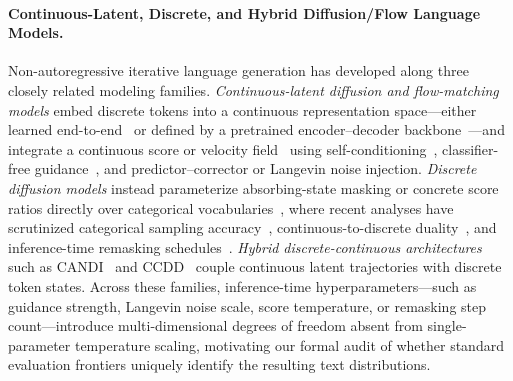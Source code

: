 \documentclass[11pt,a4paper]{article}
\begin{document}
\paragraph{Continuous-Latent, Discrete, and Hybrid Diffusion/Flow Language Models.}
Non-autoregressive iterative language generation has developed along three closely related modeling families. \emph{Continuous-latent diffusion and flow-matching models} embed discrete tokens into a continuous representation space---either learned end-to-end~\citep{li2022diffusionlm,dieleman2022cdcd,gulrajani2023plaid} or defined by a pretrained encoder--decoder backbone~\citep{raffel2020exploring,lovelace2023ld4lg,hu2026elf,jiang2026textldm,guo2026coladlm}---and integrate a continuous score or velocity field~\citep{lipman2023flow} using self-conditioning~\citep{chen2023analog}, classifier-free guidance~\citep{ho2022classifier}, and predictor--corrector or Langevin noise injection. \emph{Discrete diffusion models} instead parameterize absorbing-state masking or concrete score ratios directly over categorical vocabularies~\citep{lou2024sedd,sahoo2024mdlm}, where recent analyses have scrutinized categorical sampling accuracy~\citep{zheng2025masked}, continuous-to-discrete duality~\citep{sahoo2025duo}, and inference-time remasking schedules~\citep{wang2025remdm}. \emph{Hybrid discrete-continuous architectures} such as CANDI~\citep{pynadath2025candi} and CCDD~\citep{zhou2025ccdd} couple continuous latent trajectories with discrete token states. Across these families, inference-time hyperparameters---such as guidance strength, Langevin noise scale, score temperature, or remasking step count---introduce multi-dimensional degrees of freedom absent from single-parameter temperature scaling, motivating our formal audit of whether standard evaluation frontiers uniquely identify the resulting text distributions.
\end{document}
